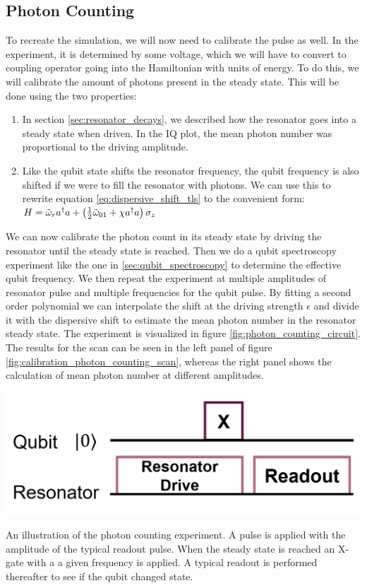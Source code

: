 \subsection{Photon Counting}
To recreate the simulation, we will now need to calibrate the pulse as well. In the experiment, it is determined by some voltage, which we will have to convert to coupling operator going into the Hamiltonian with units of energy. To do this, we will calibrate the amount of photons present in the steady state. This will be done using the two properties:
\begin{enumerate}
    \item In section \ref{sec:resonator_decays}, we described how the resonator goes into a steady state when driven. In the IQ plot, the mean photon number was proportional to the driving amplitude. 
    \item Like the qubit state shifts the resonator frequency, the qubit frequency is also shifted if we were to fill the resonator with photons. We can use this to rewrite equation \ref{eq:dispersive_shift_tls} to the convenient form: $H = \Tilde{\omega}_r a^\dagger a  + \left(\frac12 \Tilde{\omega}_{01} + \chi a^\dagger a\right)  \sigma_z$
\end{enumerate}
We can now calibrate the photon count in its steady state by driving the resonator until the steady state is reached. Then we do a qubit spectroscopy experiment like the one in \ref{sec:qubit_spectroscopy} to determine the effective qubit frequency. We then repeat the experiment at multiple amplitudes of resonator pulse and multiple frequencies for the qubit pulse. By fitting a second order polynomial we can interpolate the shift at the driving strength $\epsilon$ and divide it with the dispersive shift to estimate the mean photon number in the resonator steady state. The experiment is visualized in figure \ref{fig:photon_counting_circuit}. The results for the scan can be seen in the left panel of figure \ref{fig:calibration_photon_counting_scan}, whereas the right panel shows the calculation of mean photon number at different amplitudes.  
\begin{marginfigure}[-4 cm]
    \centering
    \includegraphics{Figs/circuits/photon_counting.png}
    \caption{An illustration of the photon counting experiment. A pulse is applied with the amplitude of the typical readout pulse. When the steady state is reached an X-gate with a a given frequency is applied. A typical readout is performed thereafter to see if the qubit changed state.}
    \label{fig:photon_counting_circuit}
\end{marginfigure}

